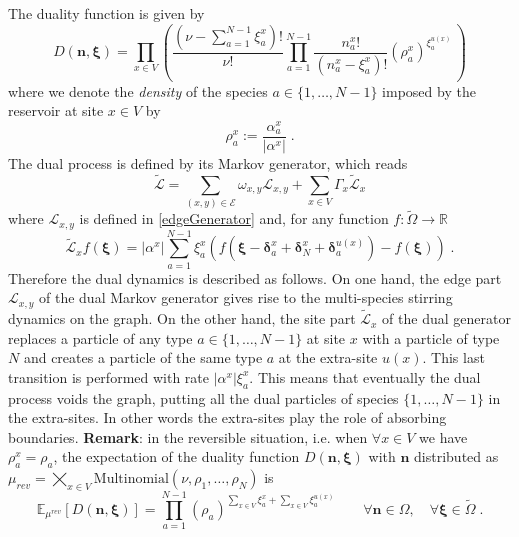 \documentclass[10pt]{article}
\numberwithin{equation}{section}
\numberwithin{equation}{subsection}
\newcommand{\dt}{\;.}
\newcommand{\twoj}{\nu}
\begin{document}
The duality function is given by
\begin{equation}\label{dualityElements}
	D(\bm{n},\bm{\xi})=\prod_{x\in V}\left(\frac{(\nu -\sum_{a=1}^{N-1}\xi_{a}^{x})!}{\nu!}\prod_{a=1}^{N-1}\frac{n_{a}^{x}!}{(n_{a}^{x}-\xi_{a}^{x})!}\left(\rho_{a}^{x}\right)^{\xi_{a}^{u(x)}}\,\right)
\end{equation}
where we denote the \textit{density} of the species $a\in \{1,\ldots,N-1\}$ imposed by the reservoir at site $x\in V$  by 
\begin{equation}
\rho_{a}^{x}:=\frac{\alpha_{a}^{x}}{|\alpha^{x}|}\dt
\end{equation}
The dual process is defined by its Markov generator, which reads
 \begin{equation}\label{DualGenerator}
    \widetilde{\mathcal{L}}=\sum_{(x,y)\in \mathcal{E}}\omega_{x,y}\mathcal{L}_{x,y}+\sum_{x\in V}\Gamma_{x}\widetilde{\mathcal{L}}_{x}
\end{equation}
where 
$\mathcal{L}_{x,y}$ is defined in \eqref{edgeGenerator} and, for any function $f:\widetilde{\Omega}\to \mathbb{R}$ 
\begin{equation}\label{siteDualGenerator}
    \widetilde{\mathcal{L}}_{x}f(\bm{\xi})=|\alpha^{x}|\sum_{a=1}^{N-1}\xi_{a}^{x}\left(f(\bm{\xi}-\bm{\delta}_{a}^{x}+\bm{\delta}_{N}^{x}+\bm{\delta}_{a}^{u(x)})-f(\bm{\xi})\right)\dt
\end{equation}
\newline
Therefore the dual dynamics is described as follows. On one hand, the edge part $\mathcal{L}_{x,y}$ of the dual Markov generator gives rise to  the multi-species stirring dynamics on the graph. On the other hand, the site
part $\widetilde{\mathcal{L}}_{x}$ of the dual generator replaces a particle of any type $a\in\{1,\ldots,N-1\}$ at site $x$ with a particle of type $N$ and creates a particle of the same type $a$ at the extra-site $u(x)$. This last transition is performed with rate $|\alpha^{x}|\xi_{a}^{x}$. This means that eventually the dual process voids the graph, putting all the dual particles of species $\{1,\ldots,N-1\}$ in the extra-sites. In other words the extra-sites play the role of absorbing boundaries. 
\newline \newline
\textbf{Remark}: in the reversible situation, i.e. when $\forall x\in V$ we have $\rho_{a}^{x}=\rho_{a}$, the expectation  of the duality function  $D(\bm{n},\bm{\xi})$ with   $\bm{n}$ distributed as  $\mu_{rev} = \bigtimes_{x\in V}\text{Multinomial}\left(\twoj, \rho_{1},\ldots,\rho_{N}\right)$ is
\begin{equation}
\mathbb{E}_{\mu^{rev}}\left[D(\bm{n},\bm{\xi})\right]=\prod_{a=1}^{N-1}\left(\rho_{a}\right)^{\sum_{x\in V}\xi_{a}^{x}+\sum_{x\in V}\xi_{a}^{u(x)}}\qquad \forall \bm{n}\in \Omega,\quad\forall \bm{\xi}\in \widetilde{\Omega}\dt
\end{equation}
\end{document}
